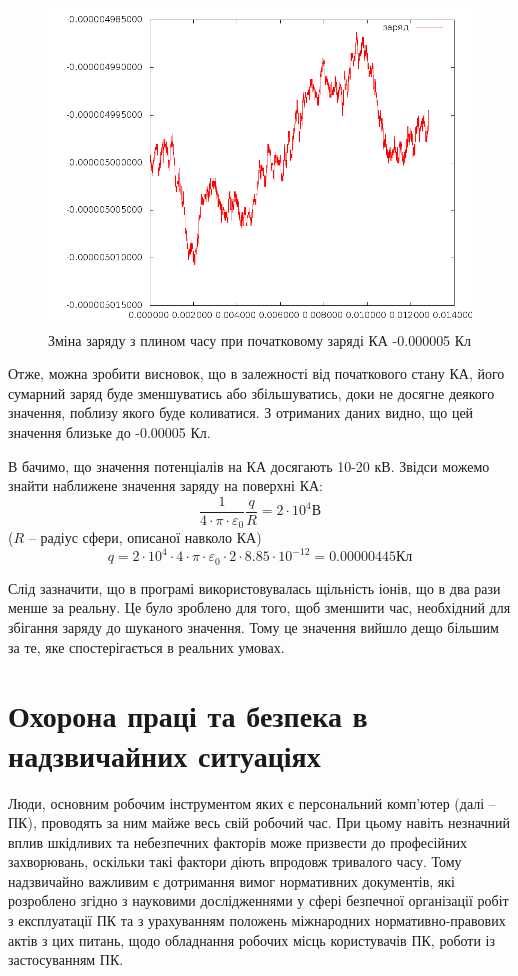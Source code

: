 \documentclass[a4paper,12pt]{article}
\begin{document}
\begin{figure}[!htp]
\centering
\includegraphics[scale=0.50]{screens/000005_txt.png}
\caption{Зміна заряду з плином часу при початковому заряді КА -0.000005 Кл}
\end{figure}

Отже, можна зробити висновок, що в залежності від початкового стану КА, його сумарний заряд буде зменшуватись або збільшуватись, доки не досягне деякого значення, поблизу якого буде коливатися. З отриманих даних видно, що цей значення близьке до -0.00005 Кл.

В \cite{novikov} бачимо, що значення потенціалів на КА досягають 10-20 кВ. Звідси можемо знайти наближене значення заряду на поверхні КА:
\[
\frac{1}{4 \cdot \pi \cdot \varepsilon_0} \frac{q}{R}  = 2 \cdot 10^4 \text{В}
\]
($R$ -- радіус сфери, описаної навколо КА)
\[
q = 2 \cdot 10^4 \cdot 4 \cdot \pi \cdot \varepsilon_0 \cdot 2 \cdot 8.85 \cdot 10^{-12} = 0.00000445 \text{Кл}
\]

Слід зазначити, що в програмі використовувалась щільність іонів, що в два рази менше за реальну. Це було зроблено для того, щоб зменшити час, необхідний для збігання заряду до шуканого значення. Тому це значення вийшло дещо більшим за те, яке спостерігається в реальних умовах.



\newpage
\section{Охорона праці та безпека в надзвичайних ситуаціях}

Люди, основним робочим інструментом яких є персональний комп’ютер (далі -- ПК), проводять за ним майже весь свій робочий час. При цьому навіть незначний вплив шкідливих та небезпечних факторів може призвести до професійних захворювань, оскільки такі фактори діють впродовж тривалого часу. Тому надзвичайно важливим є дотримання вимог нормативних документів, які розроблено згідно з  науковими дослідженнями у сфері безпечної організації робіт з експлуатації ПК та з урахуванням положень міжнародних нормативно-правових актів з цих питань, щодо обладнання робочих місць користувачів ПК, роботи із застосуванням ПК.
\end{document}
